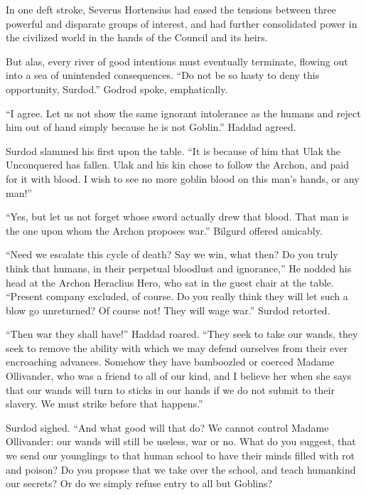 In one deft stroke, Severus Hortensius had eased the tensions between three powerful and disparate groups of interest, and had further consolidated power in the civilized world in the hands of the Council and its heirs.

But alas, every river of good intentions must eventually terminate, flowing out into a sea of unintended consequences.
\simpleline
{}
“Do not be so hasty to deny this opportunity, Surdod.” Godrod spoke, emphatically.

“I agree. Let us not show the same ignorant intolerance as the humans and reject him out of hand simply because he is not Goblin.” Haddad agreed.

Surdod slammed his first upon the table. “It is because of him that Ulak the Unconquered has fallen. Ulak and his kin chose to follow the Archon, and paid for it with blood. I wish to see no more goblin blood on this man’s hands, or any man!”

“Yes, but let us not forget whose sword actually drew that blood. That man is the one upon whom the Archon proposes war.” Bilgurd offered amicably.

“Need we escalate this cycle of death? Say we win, what then? Do you truly think that humans, in their perpetual bloodlust and ignorance,” He nodded his head at the Archon Heraclius Hero, who sat in the guest chair at the table. “Present company excluded, of course. Do you really think they will let such a blow go unreturned? Of course not! They will wage war.” Surdod retorted.

“Then war they shall have!” Haddad roared. “They seek to take our wands, they seek to remove the ability with which we may defend ourselves from their ever encroaching advances. Somehow they have bamboozled or coerced Madame Ollivander, who was a friend to all of our kind, and I believe her when she says that our wands will turn to sticks in our hands if we do not submit to their slavery. We must strike before that happens.”

Surdod sighed. “And what good will that do? We cannot control Madame Ollivander: our wands will still be useless, war or no. What do you suggest, that we send our younglings to that human school to have their minds filled with rot and poison? Do you propose that we take over the school, and teach humankind our secrets? Or do we simply refuse entry to all but Goblins?

